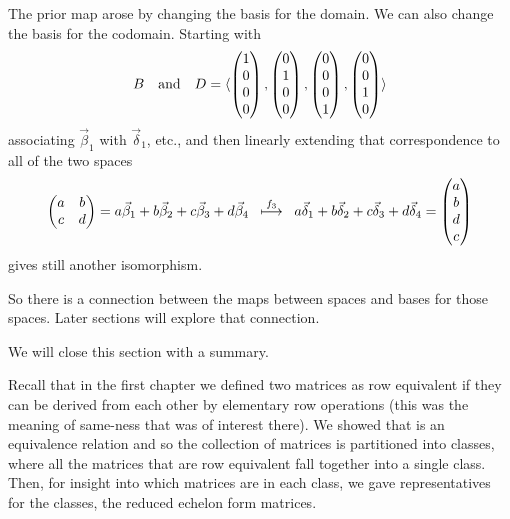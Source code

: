 \begin{example}
The prior map arose by changing the basis for the domain.
We can also change the basis for the codomain.
Starting with
\begin{equation*}
  B
  \quad\text{and}\quad
  D=\langle\begin{pmatrix} 1 \\ 0 \\ 0 \\ 0 \end{pmatrix},
                \begin{pmatrix} 0 \\ 1 \\ 0 \\ 0 \end{pmatrix},
                \begin{pmatrix} 0 \\ 0 \\ 0 \\ 1 \end{pmatrix},
                \begin{pmatrix} 0 \\ 0 \\ 1 \\ 0 \end{pmatrix}\rangle
\end{equation*}
associating $\vec{\beta}_1$ with $\vec{\delta}_1$, etc., and then
linearly extending that correspondence to all of the two spaces
\begin{equation*}
  \begin{pmatrix}
     a  &b  \\
     c  &d  
   \end{pmatrix}
  =a\vec{\beta}_1+b\vec{\beta}_2+c\vec{\beta}_3+d\vec{\beta}_4
  \;\;\stackrel{f_3}{\longmapsto}\;\;
  a\vec{\delta}_1+b\vec{\delta}_2+c\vec{\delta}_3+d\vec{\delta}_4
  =\begin{pmatrix} a \\ b \\ d \\ c \end{pmatrix}
\end{equation*}
gives still another isomorphism.

So there is a connection between the maps between spaces 
and bases for those  spaces. 
Later sections will explore that connection.
\end{example}

We will close this section with a summary.

Recall that in the first chapter 
we defined two matrices as row equivalent if they can be derived 
from each other by elementary row operations (this
was the meaning of same-ness that was of interest there).
We showed that is an equivalence relation and so 
the collection of matrices is partitioned into classes, 
where all the matrices that are 
row equivalent fall together into a single class.
Then, for insight into which matrices are 
in each class, we gave representatives for the 
classes,
the reduced echelon form matrices.

